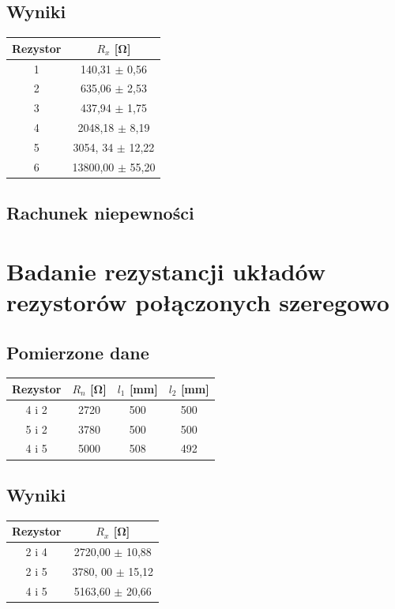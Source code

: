 \documentclass{article}
\begin{document}
\subsection{Wyniki}
\begin{center}
\begin{tabular}{ c | c }
Rezystor & $R_x$ [\si{\ohm}]\\
\hline
 1    & 140,31 $ \pm$  0,56\\ 
 2    & 635,06 $\pm$ 2,53\\ 
 3  & 437,94 $\pm$ 1,75\\ 
 4  & 2048,18 $\pm$ 8,19\\
 5   & 3054, 34 $\pm$ 12,22\\
 6  & 13800,00 $\pm$ 55,20\\

\end{tabular}
\end{center}

\subsection{Rachunek niepewności}



\section{Badanie rezystancji układów rezystorów połączonych szeregowo}
\subsection{Pomierzone dane}
\begin{center}
\begin{tabular}{ c |  c | c | c}
Rezystor & $R_n$ [\si{\ohm}] & $l_1$ [mm] & $l_2$ [mm]\\
\hline 
 4 i 2 & 2720 & 500 & 500\\ 
 5 i 2 & 3780 & 500 & 500\\ 
4 i 5 & 5000 & 508 & 492\\ 
\end{tabular}
\end{center}

\subsection{Wyniki}
\begin{center}
\begin{tabular}{ c | c }
Rezystor & $R_x$ [\si{\ohm}]\\
\hline
 2 i 4  & 2720,00 $\pm$ 10,88\\ 
 2 i 5  & 3780, 00 $\pm$ 15,12\\ 
 4 i 5  & 5163,60 $\pm$ 20,66\\ 
\end{tabular}
\end{center}
\end{document}
